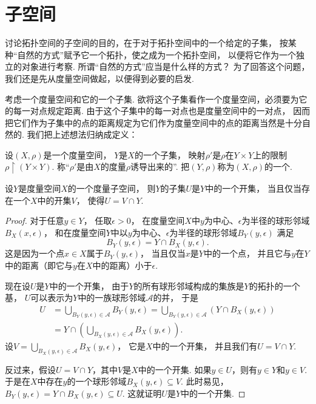 \section{子空间}
讨论拓扑空间的子空间的目的，在于对于拓扑空间中的一个给定的子集，
按某种“自然的方式”赋予它一个拓扑，使之成为一个拓扑空间，
以便将它作为一个独立的对象进行考察.
所谓“自然的方式”应当是什么样的方式？
为了回答这个问题，我们还是先从度量空间做起，以便得到必要的启发.

考虑一个度量空间和它的一个子集.
欲将这个子集看作一个度量空间，必须要为它的每一对点规定距离.
由于这个子集中的每一对点也是度量空间中的一对点，
因而把它们作为子集中的点的距离规定为它们作为度量空间中的点的距离当然是十分自然的.
我们把上述想法归纳成定义：
\begin{definition}
设\((X,\rho)\)是一个度量空间，
\(Y\)是\(X\)的一个子集，
映射\(\rho'\)是\(\rho\)在\(Y \times Y\)上的限制\(\rho \upharpoonright (Y \times Y)\).
称“\(\rho'\)是由\(X\)的度量\(\rho\)诱导出来的”.
把\((Y,\rho)\)称为\((X,\rho)\)的一个.
\end{definition}

\begin{theorem}\label{theorem:子空间.度量子空间中的开集}
设\(Y\)是度量空间\(X\)的一个度量子空间，
则\(Y\)的子集\(U\)是\(Y\)中的一个开集，
当且仅当存在一个\(X\)中的开集\(V\)，
使得\(U = V \cap Y\).
\begin{proof}
对于任意\(y \in Y\)，
任取\(\epsilon>0\)，
在度量空间\(X\)中\(y\)为中心、\(\epsilon\)为半径的球形邻域\(B_X(x,\epsilon)\)，
和在度量空间\(Y\)中以\(y\)为中心、\(\epsilon\)为半径的球形邻域\(B_Y(y,\epsilon)\)
满足\begin{equation*}
	B_Y(y,\epsilon)
	= Y \cap B_X(y,\epsilon).
\end{equation*}
这是因为一个点\(x \in X\)属于\(B_Y(y,\epsilon)\)，
当且仅当\(x\)是\(Y\)中的一个点，
并且它与\(y\)在\(Y\)中的距离（即它与\(y\)在\(X\)中的距离）小于\(\epsilon\).

现在设\(U\)是\(Y\)中的一个开集，
由于\(Y\)的所有球形邻域构成的集族是\(Y\)的拓扑的一个基，
\(U\)可以表示为\(Y\)中的一族球形邻域\(\mathscr{A}\)的并，
于是\begin{align*}
	U &= \bigcup_{B_Y(y,\epsilon) \in \mathscr{A}} B_Y(y,\epsilon)
	= \bigcup_{B_Y(y,\epsilon) \in \mathscr{A}} \left( Y \cap B_X(y,\epsilon) \right) \\
	&= Y \cap \left( \bigcup_{B_X(y,\epsilon) \in \mathscr{A}} B_X(y,\epsilon) \right).
\end{align*}
设\(V = \bigcup_{B_X(y,\epsilon) \in \mathscr{A}} B_X(y,\epsilon)\)，
它是\(X\)中的一个开集，
并且我们有\(U = V \cap Y\).

反过来，假设\(U = V \cap Y\)，其中\(V\)是\(X\)中的一个开集.
如果\(y \in U\)，则有\(y \in Y\)和\(y \in V\).
于是在\(X\)中存在\(y\)的一个球形邻域\(B_X(y,\epsilon) \subseteq V\).
此时易见，\(B_Y(y,\epsilon) = Y \cap B_X(y,\epsilon) \subseteq U\).
这就证明\(U\)是\(Y\)中的一个开集.
\end{proof}
\end{theorem}

